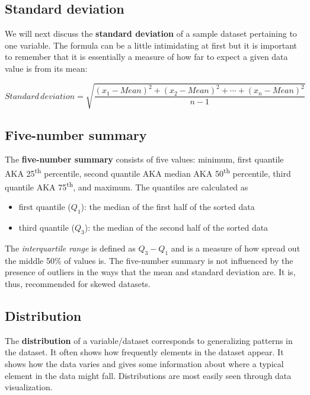\documentclass[]{book}
\providecommand{\tightlist}{%
  \setlength{\itemsep}{0pt}\setlength{\parskip}{0pt}}
\begin{document}
\hypertarget{standard-deviation}{%
\subsection{Standard deviation}\label{standard-deviation}}

We will next discuss the \textbf{standard deviation} of a sample dataset pertaining to one variable. The formula can be a little intimidating at first but it is important to remember that it is essentially a measure of how far to expect a given data value is from its mean:

\[Standard \, deviation = \sqrt{\frac{(x_1 - Mean)^2 + (x_2 - Mean)^2 + \cdots + (x_n - Mean)^2}{n - 1}}\]

\hypertarget{five-number-summary}{%
\subsection{Five-number summary}\label{five-number-summary}}

The \textbf{five-number summary} consists of five values: minimum, first quantile AKA 25\textsuperscript{th} percentile, second quantile AKA median AKA 50\textsuperscript{th} percentile, third quantile AKA 75\textsuperscript{th}, and maximum. The quantiles are calculated as

\begin{itemize}
\tightlist
\item
  first quantile (\(Q_1\)): the median of the first half of the sorted data
\item
  third quantile (\(Q_3\)): the median of the second half of the sorted data
\end{itemize}

The \emph{interquartile range} is defined as \(Q_3 - Q_1\) and is a measure of how spread out the middle 50\% of values is. The five-number summary is not influenced by the presence of outliers in the ways that the mean and standard deviation are. It is, thus, recommended for skewed datasets.

\hypertarget{distribution}{%
\subsection{Distribution}\label{distribution}}

The \textbf{distribution} of a variable/dataset corresponds to generalizing patterns in the dataset. It often shows how frequently elements in the dataset appear. It shows how the data varies and gives some information about where a typical element in the data might fall. Distributions are most easily seen through data visualization.
\end{document}
